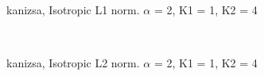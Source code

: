 \begin{figure}
  \centering
     \\
  \caption{kanizsa, Isotropic L1 norm. $\alpha$ = 2, K1 = 1, K2 = 4}
  \label{fig:kanizsa_L1_a2_k11_k24}
\end{figure}

\begin{figure}
  \centering
     \\
  \caption{kanizsa, Isotropic L2 norm. $\alpha$ = 2, K1 = 1, K2 = 4}
  \label{fig:kanizsa_L2_a2_k11_k24}
\end{figure}

